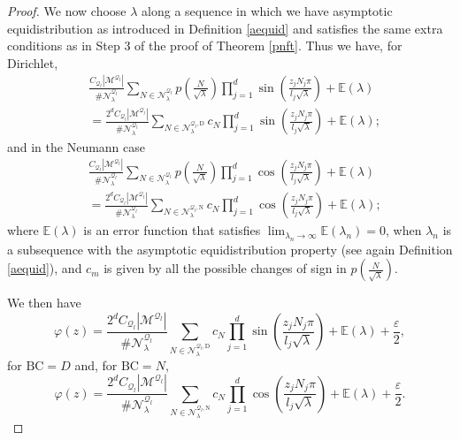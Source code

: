 \documentclass{amsart}
\theoremstyle{definition}
\theoremstyle{remark}
\newcommand{\ep}{\varepsilon}
\newcommand{\vp}{\varphi}
\numberwithin{equation}{section}
\theoremstyle{definition}
\theoremstyle{remark}
\begin{document}
\begin{proof}
	We now choose $\lambda$ along a sequence in which we have asymptotic equidistribution as introduced in Definition \ref{aequid} and satisfies the same extra conditions as in Step 3 of the proof of Theorem \ref{pnft}. Thus we have, for Dirichlet,
	\begin{equation}
		\begin{aligned}
			&\frac{C_{\mathcal{Q}_l}|\mathcal{M}^{\mathcal{Q}_l}|}{\#\mathcal{N}_\lambda^{\mathcal{Q}_l}}\sum_{N\in \mathcal{N}_\lambda^{\mathcal{Q}_l}}p\left(\frac{N}{\sqrt{\lambda}}\right) \prod_{j=1}^d\sin\left(\frac{z_jN_j\pi}{l_j\sqrt{\lambda}}\right)+\mathbb{E}(\lambda)\\
			&	=\frac{2^dC_{\mathcal{Q}_l}|\mathcal{M}^{\mathcal{Q}_l}|}{\#\mathcal{N}_\lambda^{\mathcal{Q}_l}}\sum_{N\in \mathcal{N}_\lambda^{\mathcal{Q}_l,\mathrm{D}}}c_N \prod_{j=1}^d\sin\left(\frac{z_jN_j\pi}{l_j\sqrt{\lambda}}\right)+\mathbb{E}(\lambda);
		\end{aligned}
	\end{equation}and in the Neumann case
	\begin{equation}
		\begin{aligned}
			&\frac{C_{\mathcal{Q}_l}|\mathcal{M}^{\mathcal{Q}_l}|}{\#\mathcal{N}_\lambda^{\mathcal{Q}_l}}\sum_{N\in \mathcal{N}_\lambda^{\mathcal{Q}_l}}p\left(\frac{N}{\sqrt{\lambda}}\right) \prod_{j=1}^d\cos\left(\frac{z_jN_j\pi}{l_j\sqrt{\lambda}}\right)+\mathbb{E}(\lambda)\\
			&	=\frac{2^dC_{\mathcal{Q}_l}|\mathcal{M}^{\mathcal{Q}_l}|}{\#\mathcal{N}_\lambda^{\mathcal{Q}_l}}\sum_{N\in \mathcal{N}_\lambda^{\mathcal{Q}_l,\mathrm{N}}}c_N \prod_{j=1}^d\cos\left(\frac{z_jN_j\pi}{l_j\sqrt{\lambda}}\right)+\mathbb{E}(\lambda);
		\end{aligned}
	\end{equation}where	$\mathbb{E}(\lambda)$ is an error function that satisfies $\lim_{\lambda_n\rightarrow\infty}\mathbb{E}(\lambda_n)=0$, when $\lambda_n$ is a subsequence with the asymptotic equidistribution property (see again Definition \ref{aequid}), and $c_m$ is given by all the possible changes of sign in $p\left(\frac{N}{\sqrt{\lambda}}\right)$.
	
	We then have \begin{equation}
		\vp(z)=\frac{2^dC_{\mathcal{Q}_l}|\mathcal{M}^{\mathcal{Q}_l}|}{\#\mathcal{N}_\lambda^{\mathcal{Q}_l}}\sum_{N\in \mathcal{N}_\lambda^{\mathcal{Q}_l,\mathrm{D}}}c_N \prod_{j=1}^d\sin\left(\frac{z_jN_j\pi}{l_j\sqrt{\lambda}}\right)+\mathbb{E}(\lambda)+\frac{\ep}{2},
	\end{equation}for $\mathrm{BC}=D$ and, for $\mathrm{BC}=N$, 
	\begin{equation}
		\vp(z)=\frac{2^dC_{\mathcal{Q}_l}|\mathcal{M}^{\mathcal{Q}_l}|}{\#\mathcal{N}_\lambda^{\mathcal{Q}_l}}\sum_{N\in \mathcal{N}_\lambda^{\mathcal{Q}_l,\mathrm{N}}}c_N \prod_{j=1}^d\cos\left(\frac{z_jN_j\pi}{l_j\sqrt{\lambda}}\right)+\mathbb{E}(\lambda)+\frac{\ep}{2}.
	\end{equation}
	

\end{proof}
\end{document}
